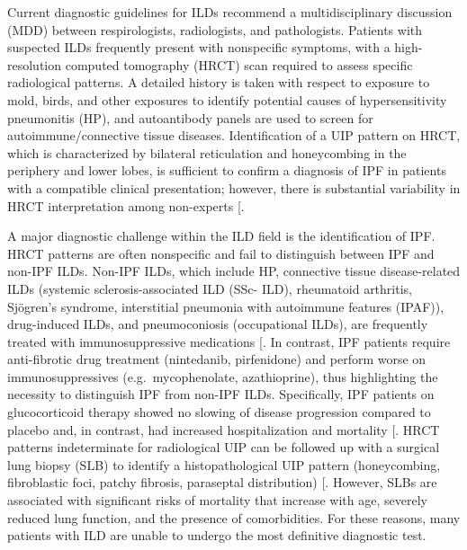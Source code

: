 \documentclass[
]{article}
\begin{document}
Current diagnostic guidelines for ILDs recommend a multidisciplinary discussion (MDD) between respirologists, radiologists, and pathologists. Patients with suspected ILDs frequently present with nonspecific symptoms, with a high-resolution computed tomography (HRCT) scan required to assess specific radiological patterns. A detailed history is taken with respect to exposure to mold, birds, and other exposures to identify potential causes of hypersensitivity pneumonitis (HP), and autoantibody panels are used to screen for autoimmune/connective tissue diseases. Identification of a UIP pattern on HRCT, which is characterized by bilateral reticulation and honeycombing in the periphery and lower lobes, is sufficient to confirm a diagnosis of IPF in patients with a compatible clinical presentation; however, there is substantial variability in HRCT interpretation among non-experts {[}\citeproc{ref-raghu_diagnosis_2018}{1}{]}.

A major diagnostic challenge within the ILD field is the identification of IPF. HRCT patterns are often nonspecific and fail to distinguish between IPF and non-IPF ILDs. Non-IPF ILDs, which include HP, connective tissue disease-related ILDs (systemic sclerosis-associated ILD (SSc- ILD), rheumatoid arthritis, Sjögren's syndrome, interstitial pneumonia with autoimmune features (IPAF)), drug-induced ILDs, and pneumoconiosis (occupational ILDs), are frequently treated with immunosuppressive medications {[}\citeproc{ref-lederer_idiopathic_2018}{13}{]}. In contrast, IPF patients require anti-fibrotic drug treatment (nintedanib, pirfenidone) and perform worse on immunosuppressives (e.g.~mycophenolate, azathioprine), thus highlighting the necessity to distinguish IPF from non-IPF ILDs. Specifically, IPF patients on glucocorticoid therapy showed no slowing of disease progression compared to placebo and, in contrast, had increased hospitalization and mortality {[}\citeproc{ref-idiopathic_pulmonary_fibrosis_clinical_research_network_prednisone_2012}{14}{]}. HRCT patterns indeterminate for radiological UIP can be followed up with a surgical lung biopsy (SLB) to identify a histopathological UIP pattern (honeycombing, fibroblastic foci, patchy fibrosis, paraseptal distribution) {[}\citeproc{ref-lynch_diagnostic_2018}{15}{]}. However, SLBs are associated with significant risks of mortality that increase with age, severely reduced lung function, and the presence of comorbidities. For these reasons, many patients with ILD are unable to undergo the most definitive diagnostic test.
\end{document}
